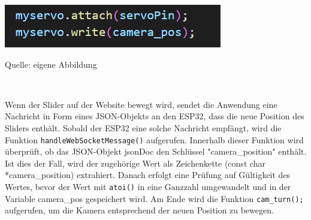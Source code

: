 \documentclass[ngerman,12pt,a4paper]{article}
\begin{document}
				\begin{center}
					\begin{minipage}[t]{0.6\textwidth}
						\includegraphics{Pictures/servofunktionen}
						\label{fig:servofunktionen}
						\vspace{-10pt}
						\begin{center}
							\par\small Quelle: eigene Abbildung 
						\end{center}
					\end{minipage} \\[0.70cm]
				\end{center}
				Wenn der Slider auf der Website bewegt wird, sendet die Anwendung eine Nachricht in Form eines JSON-Objekts an den ESP32, dass die neue Position des Sliders enthält. Sobald der ESP32 eine solche Nachricht empfängt, wird die Funktion \texttt{handleWebSocketMessage()} aufgerufen. Innerhalb dieser Funktion wird überprüft, ob das JSON-Objekt jsonDoc den Schlüssel "camera\_position" enthält. Ist dies der Fall, wird der zugehörige Wert als Zeichenkette (const char *camera\_position) extrahiert. Danach erfolgt eine Prüfung auf Gültigkeit des Wertes, bevor der Wert mit \texttt{atoi()} in eine Ganzzahl umgewandelt und in der Variable camera\_pos gespeichert wird. Am Ende wird die Funktion \texttt{cam\_turn();} aufgerufen, um die Kamera entsprechend der neuen Position zu bewegen. 
				
\end{document}
